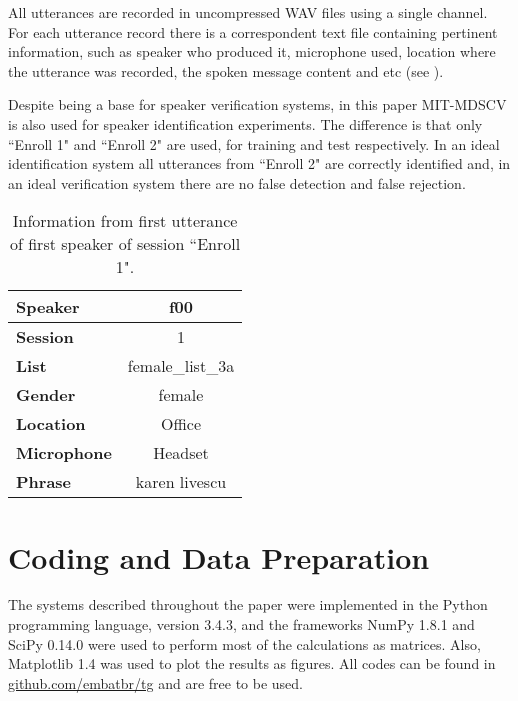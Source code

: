 All utterances are recorded in uncompressed WAV files using a single channel. For each utterance record there is a correspondent text file containing pertinent information, such as speaker who produced it, microphone used, location where the utterance was recorded, the spoken message content and etc (see ).

Despite being a base for speaker verification systems, in this paper MIT-MDSCV is also used for speaker identification experiments. The difference is that only ``Enroll 1" and ``Enroll 2" are used, for training and test respectively. In an ideal identification system all utterances from ``Enroll 2" are correctly identified and, in an ideal verification system there are no false detection and false rejection.

\begin{table}[h]
    \centering
    \begin{tabular}{|l|c|}
    \hline
    {\bf Speaker}    & f00              \\ \hline
    {\bf Session}    & 1                \\ \hline
    {\bf List}       & female\_list\_3a \\ \hline
    {\bf Gender}     & female           \\ \hline
    {\bf Location}   & Office           \\ \hline
    {\bf Microphone} & Headset          \\ \hline
    {\bf Phrase}     & karen livescu    \\ \hline
    \end{tabular}
    \caption{Information from first utterance of first speaker of session ``Enroll 1".}
    \label{tab:utterance-info}
\end{table}

\section{Coding and Data Preparation}
\label{sec:coding-and-data-preparation}

The systems described throughout the paper were implemented in the Python programming language, version 3.4.3, and the frameworks NumPy 1.8.1 and SciPy 0.14.0 were used to perform most of the calculations as matrices. Also, Matplotlib 1.4 was used to plot the results as figures. All codes can be found in \url{github.com/embatbr/tg} and are free to be used.

